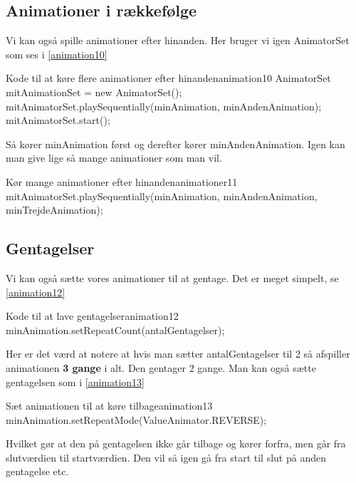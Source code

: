 \subsection{Animationer i rækkefølge}
Vi kan også spille animationer efter hinanden. Her bruger vi igen AnimatorSet som ses i \autoref{animation10}
\begin{JavaCode}{Kode til at køre flere animationer efter hinanden}{animation10}
	AnimatorSet mitAnimationSet = new AnimatorSet();
	mitAnimatorSet.playSequentially(minAnimation, minAndenAnimation);
	mitAnimatorSet.start();
\end{JavaCode}
Så kører minAnimation først og derefter kører minAndenAnimation. Igen kan man give lige så mange animationer som man vil. 
\begin{JavaCode}{Kør mange animationer efter hinanden}{animationer11}
	mitAnimatorSet.playSequentially(minAnimation, minAndenAnimation, minTrejdeAnimation);
\end{JavaCode}
\subsection{Gentagelser}
Vi kan også sætte vores animationer til at gentage. Det er meget simpelt, se \autoref{animation12}
\begin{JavaCode}{Kode til at lave gentagelser}{animation12}
	minAnimation.setRepeatCount(antalGentagelser);
\end{JavaCode}
Her er det værd at notere at hvis man sætter antalGentagelser til 2 så afspiller animationen \textbf{3 gange} i alt. Den gentager 2 gange.
Man kan også sætte gentagelsen som i \autoref{animation13}
\begin{JavaCode}{Sæt animationen til at køre tilbage}{animation13}
	minAnimation.setRepeatMode(ValueAnimator.REVERSE);
\end{JavaCode}
Hvilket gør at den på gentagelsen ikke går tilbage og kører forfra, men går fra slutværdien til startværdien. Den vil så igen gå fra start til slut på anden gentagelse etc.

